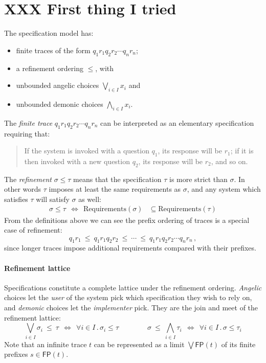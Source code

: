 \documentclass[11pt]{article}
\begin{document}
\section*{XXX First thing I tried}

The specification model has:
\begin{itemize}
  \item finite traces of the form $q_1 r_1 q_2 r_2 \cdots q_n r_n$;
  \item a refinement ordering $\le$, with
  \item unbounded angelic choices $\bigvee_{i \in I} x_i$ and
  \item unbounded demonic choices $\bigwedge_{i \in I} x_i$.
\end{itemize}
The \emph{finite trace} $q_1 r_1 q_2 r_2 \cdots q_n r_n$
can be interpreted as an elementary specification requiring that:
\begin{quote}
  If the system is invoked with a question $q_1$,
  its response will be $r_1$;
  if it is then invoked with a new question $q_2$,
  its response will be $r_2$,
  and so on.
\end{quote}
The \emph{refinement} $\sigma \le \tau$
means that the specification $\tau$ is more strict than $\sigma$.
In other words $\tau$ imposes at least the same requirements as $\sigma$,
and any system which satisfies $\tau$ will satisfy $\sigma$ as well:
\begin{align*}
  \sigma \le \tau
  \:\:\Longleftrightarrow\:\:
  \mathrm{Requirements}(\sigma) &\subseteq
  \mathrm{Requirements}(\tau)
\end{align*}
From the definitions above we can see
the prefix ordering of traces is a special case of refinement:
\[
  q_1 r_1 \:\le\: q_1 r_1 q_2 r_2 \:\le\: \cdots \:\le\: q_1 r_1 q_2 r_2 \cdots q_n r_n
  \,,
\]
since longer traces impose additional requirements
compared with their prefixes.


\paragraph{Refinement lattice}

Specifications constitute a complete lattice under the refinement ordering.
\emph{Angelic} choices let the \emph{user} of the system
pick which specification they wish to rely on,
and \emph{demonic} choices let the \emph{implementer} pick.
They are the join and meet of the refinement lattice:
\[
  \bigvee_{i \in I} \sigma_i \:\le\: \tau
  \:\:\Leftrightarrow\:\:
  \forall i \in I \mathbin. \sigma_i \le \tau
  \qquad \qquad
  \sigma \:\le\: \bigwedge_{i \in I} \tau_i
  \:\:\Leftrightarrow\:\:
  \forall i \in I \mathbin. \sigma \le \tau_i
\]
Note that
an infinite trace $t$ can be represented as
a limit $\bigvee \mathsf{FP}(t)$ of its finite prefixes
$s \in \mathsf{FP}(t)$.
\end{document}
